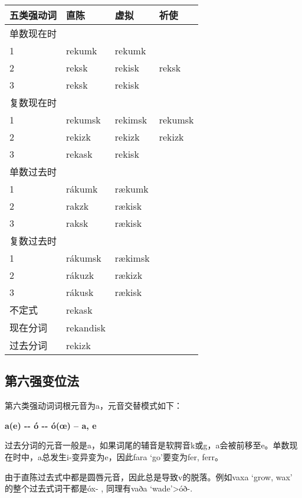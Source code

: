 \begin{longtable}{llll}
  \toprule
  五类强动词 & 直陈      & 虚拟    & 祈使    \\
  \midrule
  \endhead
  \bottomrule
  \endfoot
  单数现在时 &           &         &         \\
  1          & rekumk    & rekumk  &         \\
  2          & reksk     & rekisk  & reksk   \\
  3          & reksk     & rekisk  &         \\
  复数现在时 &           &         &         \\
  1          & rekumsk   & rekimsk & rekumsk \\
  2          & rekizk    & rekizk  & rekizk  \\
  3          & rekask    & rekisk  &         \\
  单数过去时 &           &         &         \\
  1          & rákumk    & rækumk  &         \\
  2          & rakzk     & rækisk  &         \\
  3          & raksk     & rækisk  &         \\
  复数过去时 &           &         &         \\
  1          & rákumsk   & rækimsk &         \\
  2          & rákuzk    & rækizk  &         \\
  3          & rákusk    & rækisk  &         \\
  不定式     & rekask    &         &         \\
  现在分词   & rekandisk &         &         \\
  过去分词   & rekizk    &         &         \\
\end{longtable}

\subsection{第六强变位法}\label{第六强变位法}

第六类强动词词根元音为a，元音交替模式如下：

\textbf{a(e) -\/- ó -\/- ó(œ) -- a, e}

过去分词的元音一般是a，如果词尾的辅音是软腭音k或g，a会被前移至e。单数现在时中，a总发生i-变异变为e，因此fara
`go‌'要变为fer, ferr。

由于直陈过去式中都是圆唇元音，因此总是导致v的脱落。例如vaxa `grow, wax‌'
的整个过去式词干都是óx- , 同理有vaða `wade‌'\textgreater óð-.

